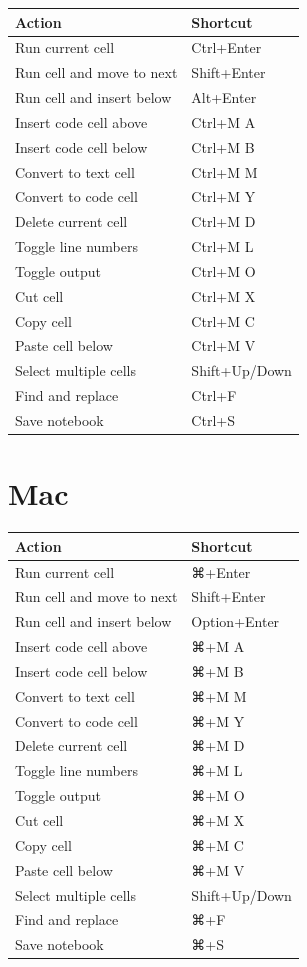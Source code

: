 \documentclass[
  letterpaper,
  DIV=11,
  numbers=noendperiod]{scrreprt}
\begin{document}
\begin{longtable}[]{@{}ll@{}}
\toprule\noalign{}
Action & Shortcut \\
\midrule\noalign{}
\endhead
\bottomrule\noalign{}
\endlastfoot
Run current cell & Ctrl+Enter \\
Run cell and move to next & Shift+Enter \\
Run cell and insert below & Alt+Enter \\
Insert code cell above & Ctrl+M A \\
Insert code cell below & Ctrl+M B \\
Convert to text cell & Ctrl+M M \\
Convert to code cell & Ctrl+M Y \\
Delete current cell & Ctrl+M D \\
Toggle line numbers & Ctrl+M L \\
Toggle output & Ctrl+M O \\
Cut cell & Ctrl+M X \\
Copy cell & Ctrl+M C \\
Paste cell below & Ctrl+M V \\
Select multiple cells & Shift+Up/Down \\
Find and replace & Ctrl+F \\
Save notebook & Ctrl+S \\
\end{longtable}

\section{Mac}

\begin{longtable}[]{@{}ll@{}}
\toprule\noalign{}
Action & Shortcut \\
\midrule\noalign{}
\endhead
\bottomrule\noalign{}
\endlastfoot
Run current cell & ⌘+Enter \\
Run cell and move to next & Shift+Enter \\
Run cell and insert below & Option+Enter \\
Insert code cell above & ⌘+M A \\
Insert code cell below & ⌘+M B \\
Convert to text cell & ⌘+M M \\
Convert to code cell & ⌘+M Y \\
Delete current cell & ⌘+M D \\
Toggle line numbers & ⌘+M L \\
Toggle output & ⌘+M O \\
Cut cell & ⌘+M X \\
Copy cell & ⌘+M C \\
Paste cell below & ⌘+M V \\
Select multiple cells & Shift+Up/Down \\
Find and replace & ⌘+F \\
Save notebook & ⌘+S \\
\end{longtable}
\end{document}
